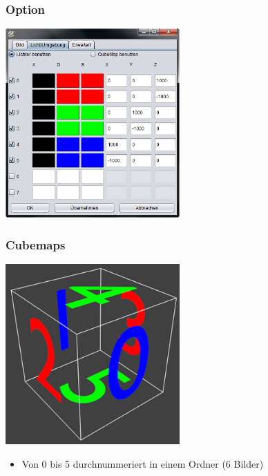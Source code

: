 \documentclass{beamer}
\begin{document}
\begin{frame}\frametitle{Option}
\includegraphics[width=0.5\textwidth]{images/program/settings1-window.png} 
\end{frame}
\begin{frame}\frametitle{Cubemaps}
 \includegraphics[width=0.5\textwidth]{images/cube.png}
\begin{itemize}
 \item Von 0 bis 5 durchnummeriert in einem Ordner (6 Bilder)
\end{itemize}
\end{frame}
\end{document}
